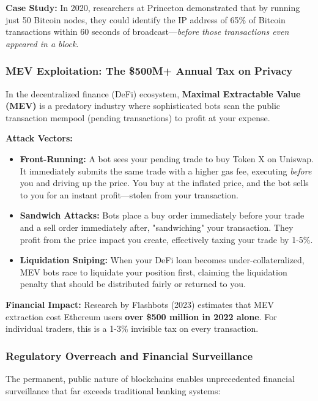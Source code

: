 \documentclass[11pt,a4paper]{article}
\begin{document}
\textbf{Case Study:} In 2020, researchers at Princeton demonstrated that by running just 50 Bitcoin nodes, they could identify the IP address of 65\% of Bitcoin transactions within 60 seconds of broadcast—\textit{before those transactions even appeared in a block}.

\subsubsection{MEV Exploitation: The \$500M+ Annual Tax on Privacy}

In the decentralized finance (DeFi) ecosystem, \textbf{Maximal Extractable Value (MEV)} is a predatory industry where sophisticated bots scan the public transaction mempool (pending transactions) to profit at your expense.

\textbf{Attack Vectors:}
\begin{itemize}
    \item \textbf{Front-Running:} A bot sees your pending trade to buy Token X on Uniswap. It immediately submits the same trade with a higher gas fee, executing \textit{before} you and driving up the price. You buy at the inflated price, and the bot sells to you for an instant profit—stolen from your transaction.

    \item \textbf{Sandwich Attacks:} Bots place a buy order immediately before your trade and a sell order immediately after, "sandwiching" your transaction. They profit from the price impact you create, effectively taxing your trade by 1-5\%.

    \item \textbf{Liquidation Sniping:} When your DeFi loan becomes under-collateralized, MEV bots race to liquidate your position first, claiming the liquidation penalty that should be distributed fairly or returned to you.
\end{itemize}

\textbf{Financial Impact:} Research by Flashbots (2023) estimates that MEV extraction cost Ethereum users \textbf{over \$500 million in 2022 alone}. For individual traders, this is a 1-3\% invisible tax on every transaction.

\subsubsection{Regulatory Overreach and Financial Surveillance}

The permanent, public nature of blockchains enables unprecedented financial surveillance that far exceeds traditional banking systems:
\end{document}
